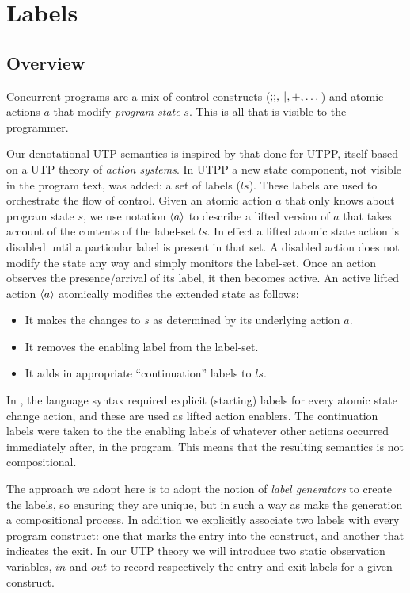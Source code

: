 \section{Labels}\label{sec:labels}

\subsection{Overview}


Concurrent programs are a mix of control constructs ($\mathbin{;\!;},\parallel,+,\dots$)
and atomic actions $a$ that modify \emph{program state} $s$.
This is all that is visible to the programmer.



Our denotational UTP semantics
is inspired by that done for UTPP\cite{DBLP:conf/icfem/WoodcockH02},
itself based on a UTP theory of \emph{action systems}.
In UTPP a new state component, not visible in the program text,
was added: a set of labels ($ls$).
These labels are used to orchestrate the flow of control.
Given an atomic action $a$ that only knows about program state $s$,
we use notation $\langle a\rangle$ to describe a lifted version
of $a$ that takes account of the contents of the label-set $ls$.
In effect a lifted atomic state action is disabled until
a particular label is present in that set.
A disabled action does not modify the state any way
and simply monitors the label-set.
Once an action observes the presence/arrival of its label,
it then becomes active.
An active lifted action $\langle a\rangle$ atomically modifies the extended state as follows:
\begin{itemize}
  \item It makes the changes to $s$ as determined by its underlying action $a$.
  \item It removes the enabling label from the label-set.
  \item It adds in appropriate ``continuation'' labels to $ls$.
\end{itemize}
In \cite{DBLP:conf/icfem/WoodcockH02},
the language syntax required explicit (starting) labels
for every atomic state change action,
and these are used as lifted action enablers.
The continuation labels were taken to the the enabling labels
of whatever other actions occurred immediately after, in the program.
This means that the resulting semantics is not compositional.

The approach we adopt here is to adopt the notion of \emph{label generators}
to create the labels, so ensuring they are unique,
but in such a way as make the generation a compositional process.
In addition we explicitly associate two labels with every program construct:
one that marks the entry into the construct,
and another that indicates the exit.
In our UTP theory we will introduce two static observation variables,
$in$ and $out$ to record respectively the entry and exit labels
for a given construct.



